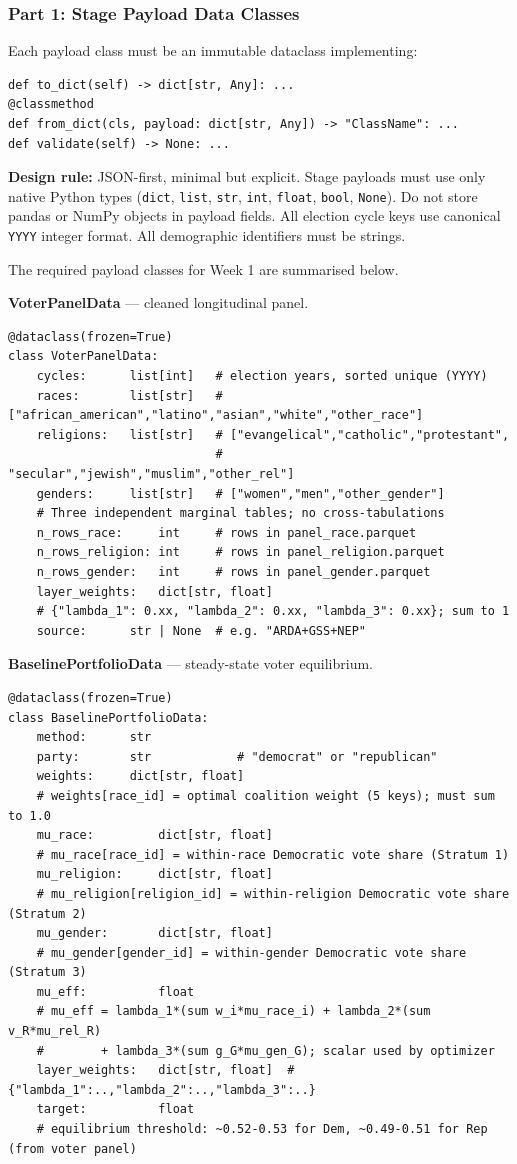 \documentclass[11pt]{article}
\begin{document}
\subsubsection*{Part 1: Stage Payload Data Classes}

Each payload class must be an immutable dataclass implementing:
\begin{lstlisting}
def to_dict(self) -> dict[str, Any]: ...
@classmethod
def from_dict(cls, payload: dict[str, Any]) -> "ClassName": ...
def validate(self) -> None: ...
\end{lstlisting}

\textbf{Design rule:} JSON-first, minimal but explicit. Stage payloads must use only native
Python types (\texttt{dict}, \texttt{list}, \texttt{str}, \texttt{int}, \texttt{float},
\texttt{bool}, \texttt{None}). Do not store pandas or NumPy objects in payload fields. All
election cycle keys use canonical \texttt{YYYY} integer format. All demographic identifiers
must be strings.

\medskip
The required payload classes for Week 1 are summarised below.

\medskip
\noindent\textbf{VoterPanelData} --- cleaned longitudinal panel.
\begin{lstlisting}
@dataclass(frozen=True)
class VoterPanelData:
    cycles:      list[int]   # election years, sorted unique (YYYY)
    races:       list[str]   # ["african_american","latino","asian","white","other_race"]
    religions:   list[str]   # ["evangelical","catholic","protestant",
                             #  "secular","jewish","muslim","other_rel"]
    genders:     list[str]   # ["women","men","other_gender"]
    # Three independent marginal tables; no cross-tabulations
    n_rows_race:     int     # rows in panel_race.parquet
    n_rows_religion: int     # rows in panel_religion.parquet
    n_rows_gender:   int     # rows in panel_gender.parquet
    layer_weights:   dict[str, float]
    # {"lambda_1": 0.xx, "lambda_2": 0.xx, "lambda_3": 0.xx}; sum to 1
    source:      str | None  # e.g. "ARDA+GSS+NEP"
\end{lstlisting}

\noindent\textbf{BaselinePortfolioData} --- steady-state voter equilibrium.
\begin{lstlisting}
@dataclass(frozen=True)
class BaselinePortfolioData:
    method:      str
    party:       str            # "democrat" or "republican"
    weights:     dict[str, float]
    # weights[race_id] = optimal coalition weight (5 keys); must sum to 1.0
    mu_race:         dict[str, float]
    # mu_race[race_id] = within-race Democratic vote share (Stratum 1)
    mu_religion:     dict[str, float]
    # mu_religion[religion_id] = within-religion Democratic vote share (Stratum 2)
    mu_gender:       dict[str, float]
    # mu_gender[gender_id] = within-gender Democratic vote share (Stratum 3)
    mu_eff:          float
    # mu_eff = lambda_1*(sum w_i*mu_race_i) + lambda_2*(sum v_R*mu_rel_R)
    #        + lambda_3*(sum g_G*mu_gen_G); scalar used by optimizer
    layer_weights:   dict[str, float]  # {"lambda_1":..,"lambda_2":..,"lambda_3":..}
    target:          float
    # equilibrium threshold: ~0.52-0.53 for Dem, ~0.49-0.51 for Rep (from voter panel)
\end{lstlisting}
\end{document}
